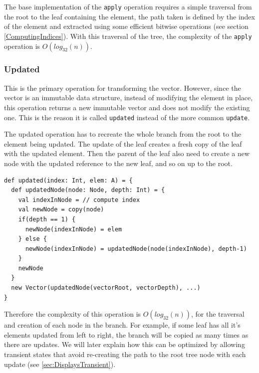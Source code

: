 The base implementation of the \texttt{apply} operation requires a simple traversal from the root to the leaf containing the element, the path taken is defined by the index of the element and extracted using some efficient bitwise operations (see section \ref{ComputingIndices}). With this traversal of the tree, the complexity of the \texttt{apply} operation is $O(log_{32}(n))$. 


\subsubsection{Updated}
\label{sec:updated}
This is the primary operation for transforming the vector. However, since the vector is an immutable data structure, instead of modifying the element in place, this operation returns a new immutable vector and does not modify the existing one. This is the reason it is called \texttt{updated} instead of the more common \texttt{update}.

The updated operation has to recreate the whole branch from the root to the element being updated. The update of the leaf creates a fresh copy of the leaf with the updated element. Then the parent of the leaf also need to create a new node with the updated reference to the new leaf, and so on up to the root. 

\begin{lstlisting}[frame=single]
def updated(index: Int, elem: A) = {
  def updatedNode(node: Node, depth: Int) = {
    val indexInNode = // compute index
    val newNode = copy(node)
    if(depth == 1) {
      newNode(indexInNode) = elem
    } else {
      newNode(indexInNode) = updatedNode(node(indexInNode), depth-1)
    }
    newNode
  }
  new Vector(updatedNode(vectorRoot, vectorDepth), ...)
}
\end{lstlisting}

Therefore the complexity of this operation is $O(log_{32}(n))$, for the traversal and creation of each node in the branch. For example, if some leaf has all it's elements updated from left to right, the branch will be copied as many times as there are updates. We will later explain how this can be optimized by allowing transient states that avoid re-creating the path to the root tree node with each update (see \ref{sec:DisplaysTransient}).

